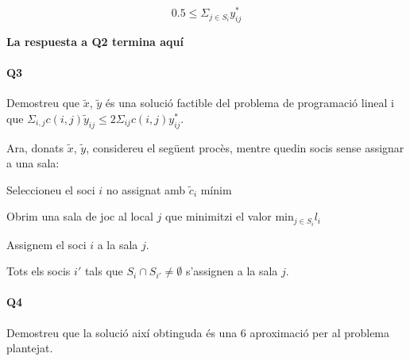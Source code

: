 \begin{equation}
 0.5 \leq \Sigma_{j \in S_i} y^*_{ij}
\end{equation}



\textbf{La respuesta a Q2 termina aquí}

\paragraph{Q3}
Demostreu que $\tilde{x}$, $\tilde{y}$ és una solució factible del problema de programació lineal i que $\Sigma_{i,j}c(i,j)\tilde{y}_{ij} \leq 2\Sigma_{ij}c(i,j)y^*_{ij}$.

Ara, donats $\tilde{x}$, $\tilde{y}$, considereu el següent procès, mentre quedin socis sense assignar a una sala: 
\begin{enumerate}[label=(\alph*)] {
\item Seleccioneu el soci $i$ no assignat amb $\tilde{c}_i$ mínim
\item Obrim una sala de joc al local $j$ que minimitzi el valor $\textrm{min}_{j \in S_i} l_i$
\item Assignem el soci $i$ a la sala $j$.
\item Tots els socis $i'$ tals que $S_i \cap S_{i'} \neq \emptyset$ s'assignen a la sala $j$.
}

\end{enumerate}

\paragraph{Q4}
Demostreu que la solució així obtinguda és una 6 aproximació per al problema plantejat.

